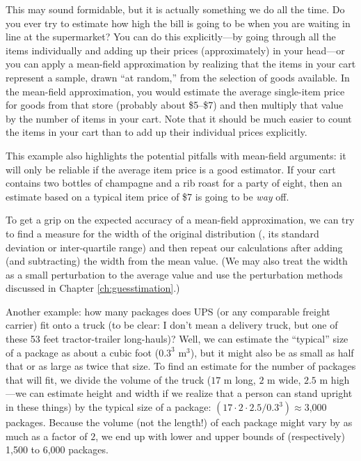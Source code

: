 This may sound formidable, but it is actually something we do all the
time.  Do you ever try to estimate how high the bill is going to be
when you are waiting in line at the supermarket? You can do this
explicitly---by going through all the items individually and adding up
their prices (approximately) in your head---or you can apply a
mean-field approximation by realizing that the items in your cart
represent a sample, drawn ``at random,'' from the selection of goods
available.  In the mean-field approximation, you would estimate the
average single-item price for goods from that store (probably about
\$5--\$7) and then multiply that value by the number of items in your
cart. Note that it should be much easier to count the items in your
cart than to add up their individual prices explicitly.

This example also highlights the potential pitfalls with mean-field
arguments: it will only be reliable if the average item price is a
good estimator. If your cart contains two bottles of champagne and a
rib roast for a party of eight, then an estimate based on a typical
item price of \$7 is going to be \emph{way} off.

To get a grip on the expected accuracy of a mean-field approximation,
we can try to find a measure for the width of the original
distribution (\eg, its standard deviation or inter-quartile range) and
then repeat our calculations after adding (and subtracting) the width
from the mean value. (We may also treat the width as a small
perturbation to the average value and use the perturbation methods
discussed in Chapter \ref{ch:guesstimation}.)

Another example: how many packages does UPS (or any comparable freight
carrier) fit onto a truck (to be clear: I don't mean a delivery
truck, but one of these 53 feet tractor-trailer long-hauls)? Well, we
can estimate the ``typical'' size of a package as about a cubic foot
($0.3^3 \text{ m}^3$), but it might also be as small as half that or
as large as twice that size. To find an estimate for the number of
packages that will fit, we divide the volume of the truck ($17$ m
long, $2$ m wide, $2.5$ m high---we can estimate height and width if
we realize that a person can stand upright in these things) by the typical
size of a package: $(17 \cdot 2 \cdot 2.5 / 0.3^3 ) \approx
\text{3,000}$ packages. Because the volume (not the length!) of each
package might vary by as much as a factor of $2$, we end up with lower
and upper bounds of (respectively) 1,500 to 6,000 packages.


